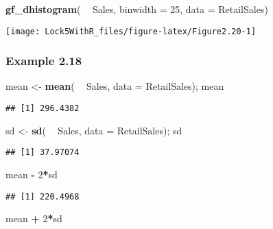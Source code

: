 \documentclass[]{book}
\newenvironment{Shaded}{\begin{snugshade}}{\end{snugshade}}
\newcommand{\DataTypeTok}[1]{\textcolor[rgb]{0.13,0.29,0.53}{#1}}
\newcommand{\DecValTok}[1]{\textcolor[rgb]{0.00,0.00,0.81}{#1}}
\newcommand{\KeywordTok}[1]{\textcolor[rgb]{0.13,0.29,0.53}{\textbf{#1}}}
\newcommand{\NormalTok}[1]{#1}
\newcommand{\OperatorTok}[1]{\textcolor[rgb]{0.81,0.36,0.00}{\textbf{#1}}}
\newcommand{\StringTok}[1]{\textcolor[rgb]{0.31,0.60,0.02}{#1}}
\begin{document}
\begin{Shaded}
\begin{Highlighting}[]
\KeywordTok{gf_dhistogram}\NormalTok{( }\OperatorTok{~}\StringTok{ }\NormalTok{Sales, }\DataTypeTok{binwidth =} \DecValTok{25}\NormalTok{, }\DataTypeTok{data =}\NormalTok{ RetailSales)}
\end{Highlighting}
\end{Shaded}

\texttt{[image: Lock5WithR\_files/figure-latex/Figure2.20-1]}

\hypertarget{example-2.18}{%
\subsubsection{Example 2.18}\label{example-2.18}}

\begin{Shaded}
\begin{Highlighting}[]
\NormalTok{mean <-}\StringTok{ }\KeywordTok{mean}\NormalTok{( }\OperatorTok{~}\StringTok{ }\NormalTok{Sales, }\DataTypeTok{data =}\NormalTok{ RetailSales); mean}
\end{Highlighting}
\end{Shaded}

\begin{verbatim}
## [1] 296.4382
\end{verbatim}

\begin{Shaded}
\begin{Highlighting}[]
\NormalTok{sd <-}\StringTok{ }\KeywordTok{sd}\NormalTok{( }\OperatorTok{~}\StringTok{ }\NormalTok{Sales, }\DataTypeTok{data =}\NormalTok{ RetailSales); sd}
\end{Highlighting}
\end{Shaded}

\begin{verbatim}
## [1] 37.97074
\end{verbatim}

\begin{Shaded}
\begin{Highlighting}[]
\NormalTok{mean }\OperatorTok{-}\StringTok{ }\DecValTok{2}\OperatorTok{*}\NormalTok{sd}
\end{Highlighting}
\end{Shaded}

\begin{verbatim}
## [1] 220.4968
\end{verbatim}

\begin{Shaded}
\begin{Highlighting}[]
\NormalTok{mean }\OperatorTok{+}\StringTok{ }\DecValTok{2}\OperatorTok{*}\NormalTok{sd}
\end{Highlighting}
\end{Shaded}
\end{document}
